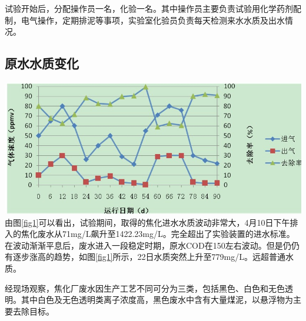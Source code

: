 试验开始后，分配操作员一名，化验一名。其中操作员主要负责试验用化学药剂配制，电气操作，定期排泥等事项，实验室化验员负责每天检测来水水质及出水情况。\par
\subsection{原水水质变化}
{
    \centering 
    \includegraphics[width=150mm]{Img/fig1.jpg}
    \label{fig1}
}
由图\ref{fig1}可以看出，试验期间，取得的焦化进水水质波动非常大，4月10日下午排入的焦化废水从71mg/L飙升至1422.23mg/L。完全超出了实验装置的进水标准。在波动渐渐平息后，废水进入一段稳定时期，原水COD在150左右波动。但是仍仍有逐步涨高的趋势，如图\ref{fig1}所示，22日水质突然上升至779mg/L。远超普通水质。\par
经现场观察，焦化厂废水因生产工艺不同可分为三类，包括黑色、白色和无色透明。其中白色及无色透明类离子浓度高，黑色废水中含有大量煤泥，以悬浮物为主要去除目标。\par
